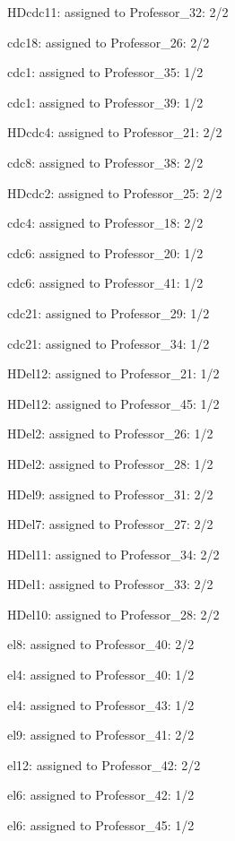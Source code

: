 \documentclass{article} %
\begin{document}
\noindent HDcdc11: assigned to Professor\_32: 2/2

\noindent cdc18: assigned to Professor\_26: 2/2

\noindent cdc1: assigned to Professor\_35: 1/2

\noindent cdc1: assigned to Professor\_39: 1/2

\noindent HDcdc4: assigned to Professor\_21: 2/2

\noindent cdc8: assigned to Professor\_38: 2/2

\noindent HDcdc2: assigned to Professor\_25: 2/2

\noindent cdc4: assigned to Professor\_18: 2/2

\noindent cdc6: assigned to Professor\_20: 1/2

\noindent cdc6: assigned to Professor\_41: 1/2

\noindent cdc21: assigned to Professor\_29: 1/2

\noindent cdc21: assigned to Professor\_34: 1/2

\noindent HDel12: assigned to Professor\_21: 1/2

\noindent HDel12: assigned to Professor\_45: 1/2

\noindent HDel2: assigned to Professor\_26: 1/2

\noindent HDel2: assigned to Professor\_28: 1/2

\noindent HDel9: assigned to Professor\_31: 2/2

\noindent HDel7: assigned to Professor\_27: 2/2

\noindent HDel11: assigned to Professor\_34: 2/2

\noindent HDel1: assigned to Professor\_33: 2/2

\noindent HDel10: assigned to Professor\_28: 2/2

\noindent el8: assigned to Professor\_40: 2/2

\noindent el4: assigned to Professor\_40: 1/2

\noindent el4: assigned to Professor\_43: 1/2

\noindent el9: assigned to Professor\_41: 2/2

\noindent el12: assigned to Professor\_42: 2/2

\noindent el6: assigned to Professor\_42: 1/2

\noindent el6: assigned to Professor\_45: 1/2

\noindent 
\end{document}
